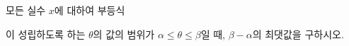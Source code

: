모든 실수 $x$에 대하여 부등식\par\smallskip{}\par\smallskip\noindent 이 성립하도록 하는 $\theta$의 값의 범위가 $\alpha\le\theta\le\beta$일 때, $\beta-\alpha$의 최댓값을 구하시오. \dmcondfill{$0\le\theta\le\pi$}{}
